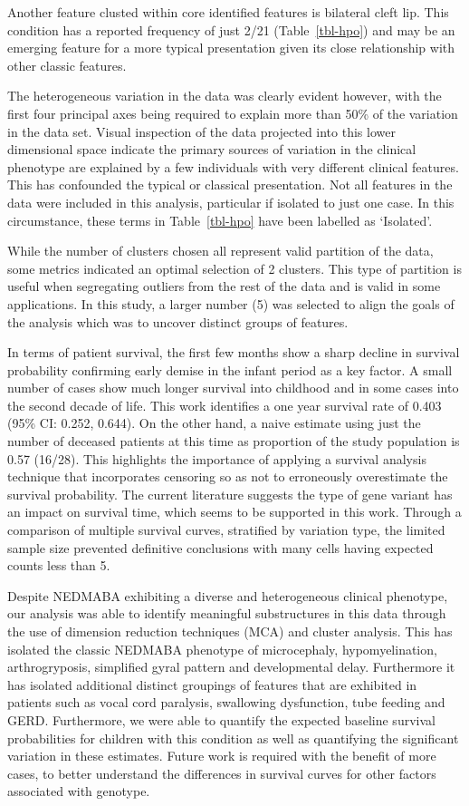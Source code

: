 \documentclass[
  authoryear,
  preprint,
  3p]{elsarticle}
\begin{document}
Another feature clusted within core identified features is bilateral
cleft lip. This condition has a reported frequency of just 2/21
(Table~\ref{tbl-hpo}) and may be an emerging feature for a more typical
presentation given its close relationship with other classic features.

The heterogeneous variation in the data was clearly evident however,
with the first four principal axes being required to explain more than
50\% of the variation in the data set. Visual inspection of the data
projected into this lower dimensional space indicate the primary sources
of variation in the clinical phenotype are explained by a few
individuals with very different clinical features. This has confounded
the typical or classical presentation. Not all features in the data were
included in this analysis, particular if isolated to just one case. In
this circumstance, these terms in Table~\ref{tbl-hpo} have been labelled
as `Isolated'.

While the number of clusters chosen all represent valid partition of the
data, some metrics indicated an optimal selection of 2 clusters. This
type of partition is useful when segregating outliers from the rest of
the data and is valid in some applications. In this study, a larger
number (5) was selected to align the goals of the analysis which was to
uncover distinct groups of features.

In terms of patient survival, the first few months show a sharp decline
in survival probability confirming early demise in the infant period as
a key factor. A small number of cases show much longer survival into
childhood and in some cases into the second decade of life. This work
identifies a one year survival rate of 0.403 (95\% CI: 0.252, 0.644). On
the other hand, a naive estimate using just the number of deceased
patients at this time as proportion of the study population is 0.57
(16/28). This highlights the importance of applying a survival analysis
technique that incorporates censoring so as not to erroneously
overestimate the survival probability. The current literature suggests
the type of gene variant has an impact on survival time, which seems to
be supported in this work. Through a comparison of multiple survival
curves, stratified by variation type, the limited sample size prevented
definitive conclusions with many cells having expected counts less than
5.

Despite NEDMABA exhibiting a diverse and heterogeneous clinical
phenotype, our analysis was able to identify meaningful substructures in
this data through the use of dimension reduction techniques (MCA) and
cluster analysis. This has isolated the classic NEDMABA phenotype of
microcephaly, hypomyelination, arthrogryposis, simplified gyral pattern
and developmental delay. Furthermore it has isolated additional distinct
groupings of features that are exhibited in patients such as vocal cord
paralysis, swallowing dysfunction, tube feeding and GERD. Furthermore,
we were able to quantify the expected baseline survival probabilities
for children with this condition as well as quantifying the significant
variation in these estimates. Future work is required with the benefit
of more cases, to better understand the differences in survival curves
for other factors associated with genotype.
\end{document}
